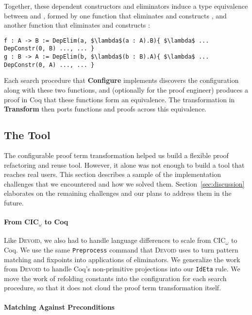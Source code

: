 Together, these dependent constructors and eliminators induce a type equivalence between \A and \B,
formed by one function that eliminates \A and constructs \B, and another function that eliminates \B and constructs \A:

\begin{lstlisting}
f : A -> B := DepElim(a, $\lambda$(a : A).B){ $\lambda$ ... DepConstr(0, B) ..., ... }
g : B -> A := DepElim(b, $\lambda$(b : B).A){ $\lambda$ ... DepConstr(0, A) ..., ... }
\end{lstlisting}
Each search procedure that \textbf{Configure} implements discovers the configuration
along with these two functions, and (optionally for the proof engineer) produces a proof in Coq that these functions form an equivalence.
The transformation in \textbf{Transform} then ports functions and proofs across this equivalence.


\subsection{The Tool}
\label{sec:implementation}


The configurable proof term transformation helped us build a flexible proof refactoring and reuse tool.
However, it alone was not enough to build a tool that reaches real users.
This section describes a sample of the implementation challenges that we encountered and how we solved them.
Section~\ref{sec:discussion} elaborates on the remaining challenges and our plans to address them in the future.

\paragraph{From CIC$_{\omega}$ to Coq}

Like \textsc{Devoid}, we also had to handle language differences to scale from CIC$_{\omega}$ to Coq.
We use the same \lstinline{Preprocess} command that \textsc{Devoid} uses to turn pattern matching and fixpoints into applications of eliminators.
We generalize the work from \textsc{Devoid} to handle Coq's non-primitive projections into our \lstinline{IdEta} rule.
We move the work of refolding constants into the configuration for each search procedure, so that it does not
cloud the proof term transformation itself.

\paragraph{Matching Against Preconditions}

